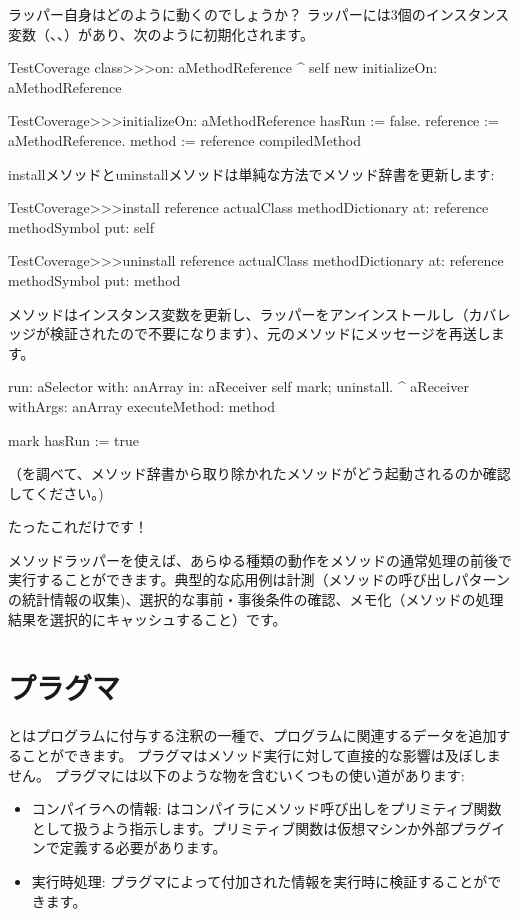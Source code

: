 \documentclass[a4paper,10pt,twoside]{book}
\begin{document}
ラッパー自身はどのように動くのでしょうか？
ラッパーには3個のインスタンス変数（、、）があり、次のように初期化されます。

\begin{code}{}
TestCoverage class>>>on: aMethodReference
	^ self new initializeOn: aMethodReference

TestCoverage>>>initializeOn: aMethodReference
	hasRun := false.
	reference := aMethodReference.
	method := reference compiledMethod
\end{code}

installメソッドとuninstallメソッドは単純な方法でメソッド辞書を更新します:
\begin{code}{}
TestCoverage>>>install
	reference actualClass methodDictionary
		at: reference methodSymbol
		put: self

TestCoverage>>>uninstall
	reference actualClass methodDictionary
		at: reference methodSymbol
		put: method
\end{code}
\noindent
{}メソッドはインスタンス変数を更新し、ラッパーをアンインストールし（カバレッジが検証されたので不要になります）、元のメソッドにメッセージを再送します。
\begin{code}{}
run: aSelector with: anArray in: aReceiver
	self mark; uninstall.
	^ aReceiver withArgs: anArray executeMethod: method

mark
	hasRun := true
\end{code}
（を調べて、メソッド辞書から取り除かれたメソッドがどう起動されるのか確認してください。)

たったこれだけです！

メソッドラッパーを使えば、あらゆる種類の動作をメソッドの通常処理の前後で実行することができます。典型的な応用例は計測（メソッドの呼び出しパターンの統計情報の収集)、選択的な事前・事後条件の確認、メモ化（メソッドの処理結果を選択的にキャッシュすること）です。

\section{プラグマ}

とはプログラムに付与する注釈の一種で、プログラムに関連するデータを追加することができます。
プラグマはメソッド実行に対して直接的な影響は及ぼしません。
プラグマには以下のような物を含むいくつもの使い道があります:
\begin{itemize}
\item コンパイラへの情報: はコンパイラにメソッド呼び出しをプリミティブ関数として扱うよう指示します。プリミティブ関数は仮想マシンか外部プラグインで定義する必要があります。
\item 実行時処理: プラグマによって付加された情報を実行時に検証することができます。
\end{itemize}
\end{document}
